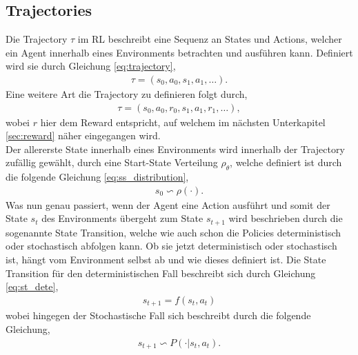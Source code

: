 \documentclass[]{iat}
\begin{document}
\subsection{Trajectories}
Die Trajectory $\tau$ im RL beschreibt eine Sequenz an States und Actions, welcher ein Agent innerhalb eines Environments betrachten und ausführen kann. Definiert wird sie durch Gleichung \ref{eq:trajectory},
\begin{align}
    \tau = (s_0, a_0, s_1, a_1, \dots) \label{eq:trajectory}.
\end{align}
Eine weitere Art die Trajectory zu definieren folgt durch,
\begin{align}
    \tau = (s_0, a_0, r_0, s_1, a_1, r_1, \dots) \label{eq:trajectory_r},
\end{align}
wobei $r$ hier dem Reward entspricht, auf welchem im nächsten Unterkapitel \ref{sec:reward} näher eingegangen wird.\\
Der allererste State innerhalb eines Environments wird innerhalb der Trajectory zufällig gewählt, durch eine Start-State Verteilung $\rho_{\theta}$, welche definiert ist durch die folgende Gleichung \ref{eq:ss_distribution},
\begin{align}
    s_0 \backsim \rho(\cdot) \label{eq:ss_distribution}.
\end{align}
Was nun genau passiert, wenn der Agent eine Action ausführt und somit der State $s_t$ des Environments übergeht zum State $s_{t+1}$ wird beschrieben durch die sogenannte State Transition, welche wie auch schon die Policies deterministisch oder stochastisch abfolgen kann. Ob sie jetzt deterministisch oder stochastisch ist, hängt vom Environment selbst ab und wie dieses definiert ist. Die State Transition für den deterministischen Fall beschreibt sich durch Gleichung \ref{eq:st_dete},\begin{align}
    s_{t+1} = f(s_t, a_t) \label{eq:st_dete}
\end{align}
wobei hingegen der Stochastische Fall sich beschreibt durch die folgende Gleichung,
\begin{align}
    s_{t+1} \backsim P(\cdot | s_t, a_t) \label{eq:st_stoch}.
\end{align}
\end{document}
